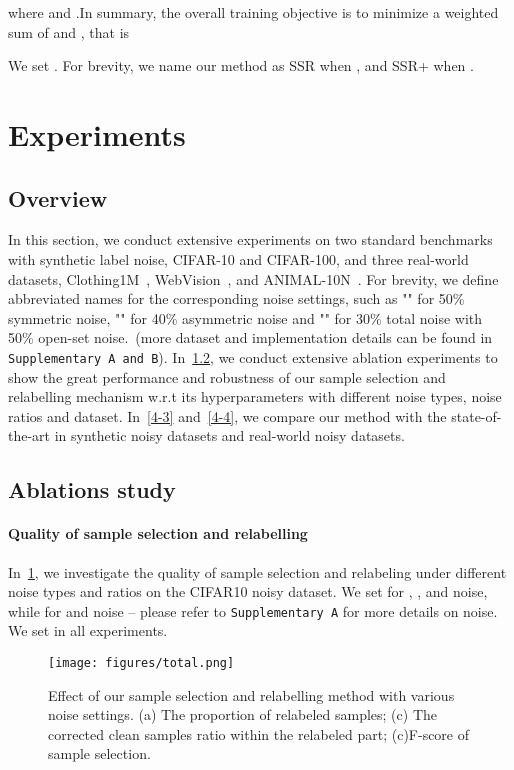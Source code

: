 \documentclass{bmvc2k}
\begin{document}
where  and .In summary, the overall training objective is to minimize a weighted sum of  and , that is 

We set . For brevity, we name our method as SSR when , and SSR+ when .



\section{Experiments}
\label{4}

\subsection{Overview}
\label{4_1}
In this section, we conduct extensive experiments on two standard benchmarks with synthetic label noise, CIFAR-10 and CIFAR-100, and three real-world datasets, Clothing1M~\citep{clothing1mdataset}, WebVision~\citep{webvision}, and ANIMAL-10N~\citep{selfie}. For brevity, we define abbreviated names for the corresponding noise settings, such as "" for 50\% symmetric noise, "" for 40\% asymmetric noise and "" for 30\% total noise with 50\% open-set noise.~(more dataset and implementation details can be found in \texttt{Supplementary A and B}). In~\cref{4-2}, we conduct extensive ablation experiments to show the great performance and robustness of our sample selection and relabelling mechanism w.r.t its hyperparameters with different noise types, noise ratios and dataset. In~\cref{4-3} and~\cref{4-4}, we compare our method with the state-of-the-art in synthetic noisy datasets and real-world noisy datasets. 

\subsection{Ablations study}
\label{4-2}

\paragraph{Quality of sample selection and relabelling} In~\cref{fig:selectionandrelabeling}, we investigate the quality of sample selection and relabeling under different noise types and ratios on the CIFAR10 noisy dataset. We set  for , ,  and  noise, while  for  and  noise -- please refer to \texttt{Supplementary A} for more details on noise. We set  in all experiments.


\begin{figure}[htbp]
\begin{center}
    \texttt{[image: figures/total.png]}
\end{center}
\caption{Effect of our sample selection and relabelling method with various noise settings. (a) The proportion of relabeled samples; (c) The corrected clean samples ratio within the relabeled part; (c)F-score of sample selection.}
\label{fig:selectionandrelabeling}
\end{figure}
\end{document}
